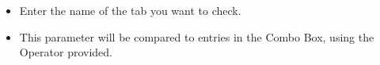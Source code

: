 \begin{itemize}
\item Enter the name of the tab you want to check.
\item This parameter will be compared to entries in the Combo Box, using the Operator provided.
\end{itemize}


    